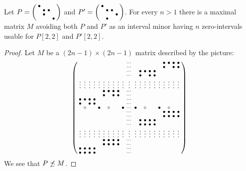 \begin{lemma}
\label{lemma:unbound3}
Let $P=\left(\begin{smallmatrix}\bullet& & & \\ &\bullet&\bullet& \\ &\bullet& & \\ & & &\bullet\end{smallmatrix}\right)$ and $P'=\left(\begin{smallmatrix}\bullet& & & \\ &\bullet&\bullet& \\ & & &\bullet\\ &\bullet& & \end{smallmatrix}\right)$. For every $n>1$ there is a maximal matrix $M$ avoiding both $P$ and $P'$ as an interval minor having $n$ zero-intervals usable for $P[2,2]$ and $P'[2,2]$.
\end{lemma}
\begin{proof} Let $M$ be a $(2n-1)\times(2n-1)$ matrix described by the picture:
$$\left(\begin{smallmatrix}	 & & & & & & & & & &\cdots& & & & & & &\bullet&\bullet&\bullet&\bullet\\
		 & & & & & & & & & &\cdots& & & & & & &\bullet& &\bullet&\bullet\\
		 & & & & & & & & & &\cdots& &\bullet&\bullet&\bullet&\bullet& & \\
		 & & & & & & & & & &\cdots& &\bullet& &\bullet&\bullet& & \\
		\vdots&\vdots&\vdots&\vdots&\vdots&\vdots&\vdots&\vdots&\vdots&\vdots&\vdots&\vdots&\vdots&\vdots&\vdots&\vdots&\vdots&\vdots&\vdots&\vdots&\vdots\\
		 & & & & &\bullet&\bullet&\bullet&\bullet& &\cdots& & & & & \\
		 & & & & &\bullet& &\bullet&\bullet& &\cdots& & & & & \\
		\bullet&\bullet&\bullet&\bullet& & & & & & &\cdots& & & & & \\
		\bullet& &\bullet&\bullet& & & & & & &\cdots& & & & & \\
		 &\circ& & &\bullet& &\circ& & &\bullet&\cdots&\bullet& &\circ& & &\bullet& &\circ& & \\
		 & & & & & & & & & &\cdots& & & & & & &\bullet&\bullet&\bullet&\bullet\\
		 & & & & & & & & & &\cdots& & & & & & &\bullet&\bullet&\bullet&\bullet\\
		 & & & & & & & & & &\cdots& &\bullet&\bullet&\bullet&\bullet& & \\
		 & & & & & & & & & &\cdots& &\bullet&\bullet&\bullet&\bullet& & \\
		\vdots&\vdots&\vdots&\vdots&\vdots&\vdots&\vdots&\vdots&\vdots&\vdots&\vdots&\vdots&\vdots&\vdots&\vdots&\vdots&\vdots&\vdots&\vdots&\vdots&\vdots\\
		 & & & & &\bullet&\bullet&\bullet&\bullet& &\cdots& & & & & \\
		 & & & & &\bullet&\bullet&\bullet&\bullet& &\cdots& & & & & \\
		\bullet&\bullet&\bullet&\bullet& & & & & & &\cdots& & & & & \\
		\bullet&\bullet&\bullet&\bullet& & & & & & &\cdots& & & & & \\
		 \end{smallmatrix}\right)$$
We see that $P\not\preceq M$.


\end{proof}
